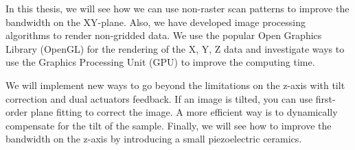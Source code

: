 In this thesis, we will see how we can use non-raster scan patterns to improve the bandwidth on the XY-plane. Also, we have developed image processing algorithms to render non-gridded data. We use the popular Open Graphics Library (OpenGL) for the rendering of the X, Y, Z data and investigate ways to use the Graphics Processing Unit (GPU) to improve the computing time.

We will implement new ways to go beyond the limitations on the z-axis with tilt correction and dual actuators feedback. If an image is tilted, you can use first-order plane fitting to correct the image. A more efficient way is to dynamically compensate for the tilt of the sample. Finally, we will see how to improve the bandwidth on the z-axis by introducing a small piezoelectric ceramics.
